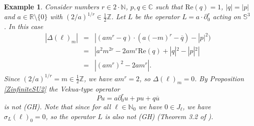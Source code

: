 \documentclass[sn-mathphys-num]{sn-jnl}%
\numberwithin{equation}{section}
\theoremstyle{thmstyleone}
\theoremstyle{thmstyletwo}
\newtheorem{example}{Example}[section]
\theoremstyle{thmstylethree}
\renewcommand{\Re}{\textrm{Re}}
\begin{document}
\begin{example} Consider numbers $r \in 2\cdot \mathbb{N}$, $p,q \in \mathbb{C}$ such that $\Re(q)=1$, $|q|=|p|$ and $a \in \mathbb{R}\setminus\{0\}$ with $(2/a)^{1/r} \in \frac{1}{2}\mathbb{Z}$. Let $L$ be the operator $L=a\cdot \partial_0^r$ acting on $\mathbb{S}^3$. In this case 
	\begin{eqnarray*} 
		|\Delta(\ell)_m| & = & |(am^r-q)\cdot (a(-m)^r-\overline{q})-|p|^2) \\
		& = & |a^2m^{2r}-2am^r\Re(q)+|q|^2-|p|^2|\\
		& = & |(am^r)^2-2am^r|.
	\end{eqnarray*}  
Since $(2/a)^{1/r}=m \in \frac{1}{2}\mathbb{Z}$, we have $am^r=2$, so $\Delta(\ell)_m=0$. By Proposition \ref{ZinfiniteSU2} the Vekua-type operator
$$Pu=a\partial_0^r u +pu+q\overline{u}$$
is not (GH). Note that since for all $\ell \in \mathbb{N}_0$ we have $0 \in J_\ell$, we have $\sigma_L(\ell)_0=0$, so the operator $L$ is also not (GH) (Theorem 3.2 of \cite{da2025diagonal}). 
\end{example} 
\end{document}
